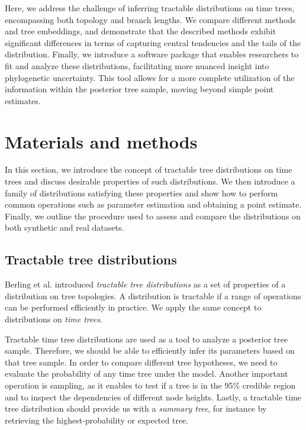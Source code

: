\documentclass[10pt,letterpaper]{article}
\begin{document}
Here, we address the challenge of inferring tractable distributions on time trees, encompassing both topology and branch lengths. We compare different methods and tree embeddings, and demonstrate that the described methods exhibit significant differences in terms of capturing central tendencies and the tails of the distribution. Finally, we introduce a software package that enables researchers to fit and analyze these distributions, facilitating more nuanced insight into phylogenetic uncertainty. This tool allows for a more complete utilization of the information within the posterior tree sample, moving beyond simple point estimates.

\section*{Materials and methods}

In this section, we introduce the concept of tractable tree distributions on time trees and discuss desirable properties of such distributions. We then introduce a family of distributions satisfying these properties and show how to perform common operations such as parameter estimation and obtaining a point estimate. Finally, we outline the procedure used to assess and compare the distributions on both synthetic and real datasets.

\subsection*{Tractable tree distributions}

Berling et al. \cite{ccd} introduced \emph{tractable tree distributions} as a set of properties of a distribution on tree topologies. A distribution is tractable if a range of operations can be performed efficiently in practice. We apply the same concept to distributions on \emph{time trees}.

Tractable time tree distributions are used as a tool to analyze a posterior tree sample. Therefore, we should be able to efficiently infer its parameters based on that tree sample. In order to compare different tree hypotheses, we need to evaluate the probability of any time tree under the model. Another important operation is sampling, as it enables to test if a tree is in the 95\% credible region and to inspect the dependencies of different node heights. Lastly, a tractable time tree distribution should provide us with a \emph{summary tree}, for instance by retrieving the highest-probability or expected tree.
\end{document}
